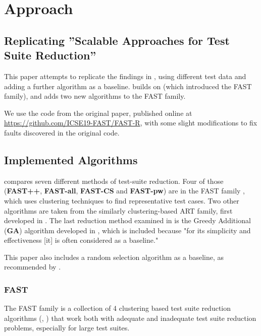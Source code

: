 
\chapter{Approach}\label{chapter:approach}

\section{Replicating ''Scalable Approaches for Test Suite Reduction''}

This paper attempts to replicate the findings in
\cite{cruciani2019scalable}, using different test data and adding a
further algorithm as a baseline. \cite{cruciani2019scalable} builds on
\cite{miranda2018fast} (which introduced the FAST family), and adds two
new algorithms to the FAST family.

We use the code from the original paper, published online at
\url{https://github.com/ICSE19-FAST/FAST-R}, with some slight
modifications to fix faults discovered in the original code.

\section{Implemented Algorithms}

\cite{cruciani2019scalable} compares seven different methods of
test-suite reduction. Four of those (\textbf{FAST++}, \textbf{FAST-all},
\textbf{FAST-CS} and \textbf{FAST-pw}) are in the FAST family , which
uses clustering techniques to find representative test cases. Two
other algorithms are taken from the similarly clustering-based ART
family, first developed in \cite{chen2010adaptive}. The last reduction
method examined in \cite{cruciani2019scalable} is the Greedy Additional
(\textbf{GA}) algorithm developed in \cite{rothermel2001prioritizing},
which is included because "for its simplicity and effectiveness [it]
is often considered as a baseline."

This paper also includes a random selection algorithm as a baseline,
as recommended by \cite{khan2018systematic}.

\subsection{FAST}

The FAST family is a collection of 4 clustering based test suite reduction
algorithms  (\cite{miranda2018fast}, \cite{cruciani2019scalable}) that
work both with adequate and inadequate test suite reduction problems,
especially for large test suites.

